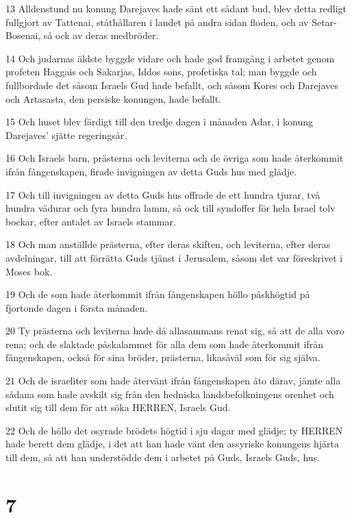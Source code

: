 \par 13 Alldenstund nu konung Darejaves hade sänt ett sådant bud, blev detta redligt fullgjort av Tattenai, ståthållaren i landet på andra sidan floden, och av Setar-Bosenai, så ock av deras medbröder.
\par 14 Och judarnas äldste byggde vidare och hade god framgång i arbetet genom profeten Haggais och Sakarjas, Iddos sons, profetiska tal; man byggde och fullbordade det såsom Israels Gud hade befallt, och såsom Kores och Darejaves och Artasasta, den persiske konungen, hade befallt.
\par 15 Och huset blev färdigt till den tredje dagen i månaden Adar, i konung Darejaves' sjätte regeringsår.
\par 16 Och Israels barn, prästerna och leviterna och de övriga som hade återkommit ifrån fångenskapen, firade invigningen av detta Guds hus med glädje.
\par 17 Och till invigningen av detta Guds hus offrade de ett hundra tjurar, två hundra vädurar och fyra hundra lamm, så ock till syndoffer för hela Israel tolv bockar, efter antalet av Israels stammar.
\par 18 Och man anställde prästerna, efter deras skiften, och leviterna, efter deras avdelningar, till att förrätta Guds tjänst i Jerusalem, såsom det var föreskrivet i Moses bok.
\par 19 Och de som hade återkommit ifrån fångenskapen höllo påskhögtid på fjortonde dagen i första månaden.
\par 20 Ty prästerna och leviterna hade då allasammans renat sig, så att de alla voro rena; och de slaktade påskalammet för alla dem som hade återkommit ifrån fångenskapen, också för sina bröder, prästerna, likasåväl som för sig själva.
\par 21 Och de israeliter som hade återvänt ifrån fångenskapen åto därav, jämte alla sådana som hade avskilt sig från den hedniska landsbefolkningens orenhet och slutit sig till dem för att söka HERREN, Israels Gud.
\par 22 Och de höllo det osyrade brödets högtid i sju dagar med glädje; ty HERREN hade berett dem glädje, i det att han hade vänt den assyriske konungens hjärta till dem, så att han understödde dem i arbetet på Guds, Israels Guds, hus.

\chapter{7}

